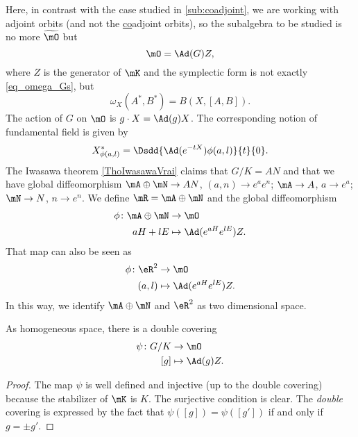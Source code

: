 Here, in contrast with the case studied in \ref{sub:coadjoint}, we are working with adjoint orbits (and not the \underline{co}adjoint orbits), so the subalgebra to be studied is no more $\widetilde{\mO}$ but
\[
    \mO=\Ad(G)Z,
\]
where $Z$ is the generator of $\mK$ and the symplectic form is not exactly \eqref{eq_omega_Gs}, but
\begin{equation}\label{eq:omega_G}
  \omega_X(A^*,B^*)=B(X,[A,B]).
\end{equation}
The action of $G$ on $\mO$ is $g\cdot X=\Ad(g)X$. The corresponding notion of fundamental field is given by
\[
   X^*_{\phi(a,l)}=\Dsdd{ \Ad(e^{-tX})\phi(a,l) }{t}{0}.
\]
The Iwasawa theorem \ref{ThoIwasawaVrai} claims that $G/K=AN$ and that we have global diffeomorphism $\mA\oplus\mN\to AN$, $(a,n)\to e^ae^n$; $\mA\to A$, $a\to e^a$; $\mN\to N$, $n\to e^n$. We define $\mR=\mA\oplus\mN$ and the global diffeomorphism 
\begin{equation}	\label{EqDefphiaHlEZ}
\begin{aligned}
 \phi\colon \mA\oplus\mN&\to \mO \\ 
 aH+lE&\mapsto \Ad( e^{aH} e^{lE})Z.
\end{aligned}
\end{equation}
 That map can also be seen as 
\begin{equation}
\begin{aligned}
 \phi\colon\eR^2&\to \mO \\ 
(a,l)&\mapsto\Ad(e^{aH}e^{lE})Z.
\end{aligned}
\end{equation}
 In this way, we identify $\mA\oplus\mN$ and $\eR^2$ as two dimensional space.
\begin{proposition}
As homogeneous space, there is a double covering
\begin{equation}
\begin{aligned}
 \psi\colon G/K&\to \mO \\ 
[g]&\mapsto \Ad(g)Z. 
\end{aligned}
\end{equation}

\end{proposition}
\begin{proof}
The map $\psi$ is well defined and injective (up to the double covering) because the stabilizer of $\mK$ is $K$. The surjective condition is clear. The \emph{double} covering is expressed by the fact that $\psi([g])=\psi([g'])$ if and only if $g=\pm g'$.
\end{proof}

